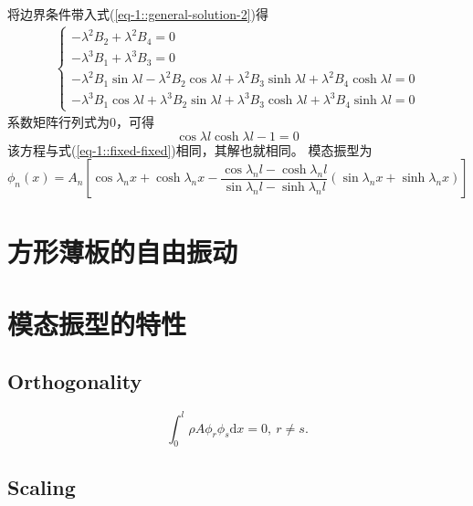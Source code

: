 将边界条件带入式(\ref{eq-1::general-solution-2})得
\begin{equation}
    \begin{aligned}
        \left\{\begin{array}{l}
            -\lambda^{2}B_{2} + \lambda^{2}B_{4} = 0\\
            -\lambda^{3}B_{1} + \lambda^{3} B_{3} = 0\\
            -\lambda^{2}B_{1}\sin \lambda l - \lambda^{2}B_{2}\cos \lambda l + \lambda^{2}B_{3}\sinh \lambda l + \lambda^{2}B_{4}\cosh \lambda l= 0\\
            -\lambda^{3}B_{1}\cos \lambda l + \lambda^{3}B_{2}\sin \lambda l + \lambda^{3}B_{3}\cosh \lambda l + \lambda^{3}B_{4}\sinh \lambda l= 0
        \end{array}\right.
    \end{aligned}
\end{equation}
系数矩阵行列式为0，可得
\begin{equation}
    \cos \lambda l \cosh \lambda l - 1=0
\end{equation}
该方程与式(\ref{eq-1::fixed-fixed})相同，其解也就相同。
模态振型为
\begin{equation}
    \phi_{n}(x)=A_{n}\left[\cos\lambda_{n}x + \cosh\lambda_{n}x - 
    \frac{\cos\lambda_{n}l - \cosh\lambda_{n}l}{\sin\lambda_{n}l - \sinh\lambda_{n}l}
    \left(\sin\lambda_{n}x + \sinh\lambda_{n}x\right)\right]    
\end{equation}

\section{方形薄板的自由振动}

\section{模态振型的特性}

\subsection{Orthogonality}

\begin{equation}
    \int_{0}^{l}\rho A\phi_{r}\phi_{s}\mathrm{d}x=0,\ r\neq s.
\end{equation}

\subsection{Scaling}

